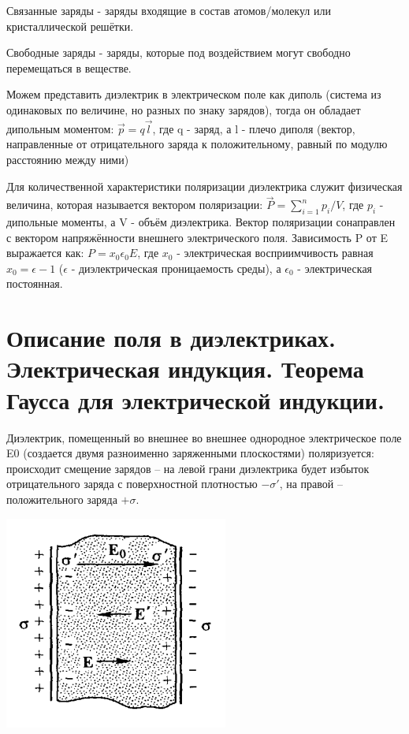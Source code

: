 \documentclass[12pt]{report}
\begin{document}
Связанные заряды - заряды входящие в состав атомов/молекул или кристаллической решётки.

Свободные заряды - заряды, которые под воздействием могут свободно перемещаться в веществе.

Можем представить диэлектрик в электрическом поле как диполь (система из одинаковых по величине, но разных по знаку зарядов), тогда он обладает дипольным моментом: $\stackrel{\xrightarrow{}}{p} = q\stackrel{\xrightarrow{}}{l}$, где q - заряд, а l - плечо диполя (вектор, направленные от отрицательного заряда к положительному, равный по модулю расстоянию между ними)

Для количественной характеристики поляризации диэлектрика служит физическая величина, которая называется вектором поляризации: $\stackrel{\xrightarrow{}}{P} = \sum\limits_{i=1}^n p_i / V$, где $p_i$ - дипольные моменты, а V - объём диэлектрика. Вектор поляризации сонаправлен с вектором напряжённости внешнего электрического поля. Зависимость P от E выражается как: $P = x_0\epsilon_0E$, где $x_0$ - электрическая восприимчивость равная $x_0 = \epsilon - 1$ ($\epsilon$ - диэлектрическая проницаемость среды), а $\epsilon_0$ - электрическая постоянная.

\section{Описание поля в диэлектриках. Электрическая индукция. Теорема Гаусса для электрической индукции.}
Диэлектрик, помещенный во внешнее во внешнее однородное электрическое поле E0 (создается двумя разноименно заряженными плоскостями) поляризуется: происходит смещение зарядов – на левой грани диэлектрика будет избыток отрицательного заряда с поверхностной плотностью $−\sigma′$, на правой –положительного заряда $+\sigma$.

\begin{center}
    \includegraphics{graphics/14.png}
\end{center}
\end{document}
